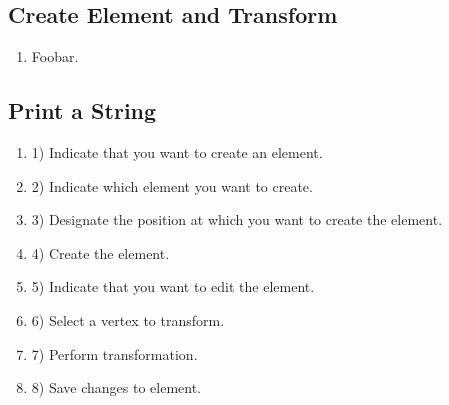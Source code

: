 \subsection{Create Element and Transform}
\label{app:euc_create_transform}

\begin{enumerate}
  \item Foobar. %
\end{enumerate}

\subsection{Print a String}
\label{app:euc_print_string}

\begin{enumerate}
  \item 1)  Indicate that you want to create an element.
  \item 2)  Indicate which element you want to create.
  \item 3)  Designate the position at which you want to create the element.
  \item 4)  Create the element.
  \item 5)  Indicate that you want to edit the element.
  \item 6)  Select a vertex to transform.
  \item 7)  Perform transformation.
  \item 8)  Save changes to element.
\end{enumerate}
